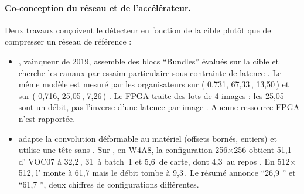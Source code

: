 \paragraph{Co-conception du réseau et de l'accélérateur.} Deux travaux conçoivent le
détecteur en fonction de la cible plutôt que de compresser un réseau de référence :
\begin{itemize}
  \item {} \citep{arxiv-1909.09709-skynet-hardware-efficient-method-object}\pp{},
    vainqueur de  2019, assemble des blocs \enquote{Bundles} évalués sur la cible
    et cherche les canaux par essaim particulaire sous contrainte de latence . Le
    même modèle est mesuré par les organisateurs sur  ( 0,731, 67,33\,, 13,50\,)
    et sur  ( 0,716, 25,05\,, 7,26\,) . Le FPGA traite des
    lots de 4 images  : les 25,05\, sont un débit, pas l'inverse d'une latence
    par image \deduit. Aucune ressource FPGA n'est rapportée.
  \item {} \citep{arxiv-2006.08357-codenet-efficient-deployment-input-adaptive}
    adapte la convolution déformable au matériel (offsets bornés, entiers) et utilise une
    tête  sans  . Sur , en W4A8, la configuration
    256$\times$256 obtient 51,1 d' VOC07 à 32,2\,, 31\, à batch~1 et 5,6\, de
    carte, dont 4,3\, au repos . En 512$\times$512, l' monte à
    61,7 mais le débit tombe à 9,3\,. Le résumé annonce \enquote{26,9 } et
    \enquote{61,7 }, deux chiffres de configurations différentes.
\end{itemize}

